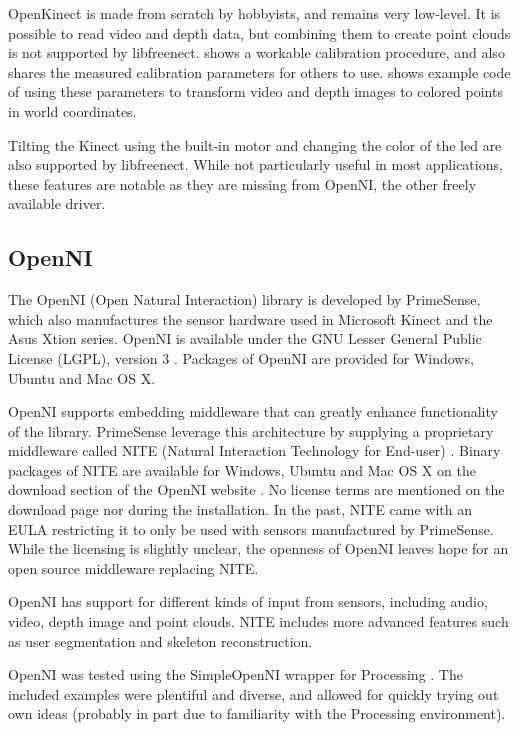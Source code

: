 OpenKinect is made from scratch by hobbyists, and remains very low-level. It is possible to read video and depth data, but combining them to create point clouds is not supported by libfreenect. \citet{burrus2010} shows a workable calibration procedure, and also shares the measured calibration parameters for others to use. \citet{fisher2010} shows example code of using these parameters to transform video and depth images to colored points in world coordinates.

Tilting the Kinect using the built-in motor and changing the color of the led are also supported by libfreenect. While not particularly useful in most applications, these features are notable as they are missing from OpenNI, the other freely available driver.

\subsection{OpenNI}

The OpenNI (Open Natural Interaction) library \citep{OpenNI} is developed by PrimeSense, which also manufactures the sensor hardware used in Microsoft Kinect and the Asus Xtion series. OpenNI is available under the GNU Lesser General Public License (LGPL), version 3 \citep{LGPL3}. Packages of OpenNI are provided for Windows, Ubuntu and Mac OS X.

OpenNI supports embedding middleware that can greatly enhance functionality of the library. PrimeSense leverage this architecture by supplying a proprietary middleware called NITE (Natural Interaction Technology for End-user) \citep{NITE}. Binary packages of NITE are available for Windows, Ubuntu and Mac OS X on the download section of the OpenNI website \citep{openniweb}. No license terms are mentioned on the download page nor during the installation. In the past, NITE came with an EULA restricting it to only be used with sensors manufactured by PrimeSense. While the licensing is slightly unclear, the openness of OpenNI leaves hope for an open source middleware replacing NITE.

OpenNI has support for different kinds of input from sensors, including audio, video, depth image and point clouds. NITE includes more advanced features such as user segmentation and skeleton reconstruction.

OpenNI was tested using the SimpleOpenNI \citep{simpleopenni} wrapper for Processing \citep{processing}. The included examples were plentiful and diverse, and allowed for quickly trying out own ideas (probably in part due to familiarity with the Processing environment).


